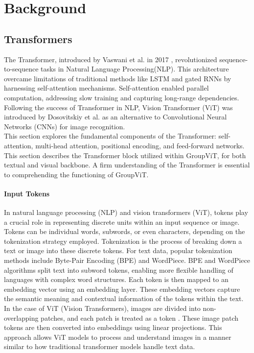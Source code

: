 \chapter{Background}\label{chap:background}



\section{Transformers}

The Transformer, introduced by Vaswani et al. in 2017 \cite{vaswani2017attention}, revolutionized sequence-to-sequence tasks in Natural Language Processing(NLP). This architecture overcame limitations of traditional methods like LSTM and gated RNNs \cite{hochreiter1997long}\cite{chung2014empirical} by harnessing self-attention mechanisms. Self-attention enabled parallel computation, addressing slow training and capturing long-range dependencies. Following the success of Transformer in NLP, Vision Transformer (ViT) was introduced by Dosovitskiy et al. \cite{dosovitskiy2020image} as an alternative to Convolutional Neural Networks (CNNs) for image recognition.\\
This section explores the fundamental components of the Transformer: self-attention, multi-head attention, positional encoding, and feed-forward networks. This section describes the Transformer block utilized within GroupViT, for both textual and visual backbone. A firm understanding of the Transformer is essential to comprehending the functioning of GroupViT.

\subsubsection{Input Tokens}
In natural language processing (NLP) and vision transformers (ViT), tokens play a crucial role in representing discrete units within an input sequence or image. Tokens can be individual words, subwords, or even characters, depending on the tokenization strategy employed.
Tokenization is the process of breaking down a text or image into these discrete tokens. For text data, popular tokenization methods include Byte-Pair Encoding (BPE) and WordPiece\cite{gage1994new}\cite{wu2016google}. BPE and WordPiece algorithms split text into subword tokens, enabling more flexible handling of languages with complex word structures. Each token is then mapped to an embedding vector using an embedding layer. These embedding vectors capture the semantic meaning and contextual information of the tokens within the text.
In the case of ViT (Vision Transformers), images are divided into non-overlapping patches, and each patch is treated as a token \cite{dosovitskiy2020image}. These image patch tokens are then converted into embeddings using linear projections. This approach allows ViT models to process and understand images in a manner similar to how traditional transformer models handle text data.

